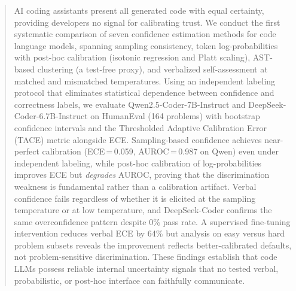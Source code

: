\documentclass{article}
\begin{document}

\printAffiliationsAndNotice{}

\begin{abstract}
AI coding assistants present all generated code with equal certainty, providing developers no signal for calibrating trust. We conduct the first systematic comparison of seven confidence estimation methods for code language models, spanning sampling consistency, token log-probabilities with post-hoc calibration (isotonic regression and Platt scaling), AST-based clustering (a test-free proxy), and verbalized self-assessment at matched and mismatched temperatures. Using an independent labeling protocol that eliminates statistical dependence between confidence and correctness labels, we evaluate Qwen2.5-Coder-7B-Instruct and DeepSeek-Coder-6.7B-Instruct on HumanEval (164 problems) with bootstrap confidence intervals and the Thresholded Adaptive Calibration Error (TACE) metric alongside ECE. Sampling-based confidence achieves near-perfect calibration (ECE\,=\,0.059, AUROC\,=\,0.987 on Qwen) even under independent labeling, while post-hoc calibration of log-probabilities improves ECE but \emph{degrades} AUROC, proving that the discrimination weakness is fundamental rather than a calibration artifact. Verbal confidence fails regardless of whether it is elicited at the sampling temperature or at low temperature, and DeepSeek-Coder confirms the same overconfidence pattern despite 0\% pass rate. A supervised fine-tuning intervention reduces verbal ECE by 64\% but analysis on easy versus hard problem subsets reveals the improvement reflects better-calibrated defaults, not problem-sensitive discrimination. These findings establish that code LLMs possess reliable internal uncertainty signals that no tested verbal, probabilistic, or post-hoc interface can faithfully communicate.
\end{abstract}

\end{document}
